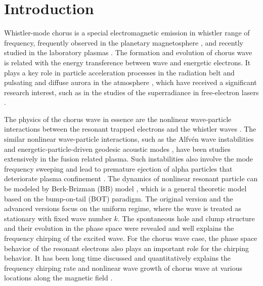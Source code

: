 \section{Introduction}
\label{sec:intro}
Whistler-mode chorus is a special electromagnetic emission in whistler range of frequency, frequently observed in the planetary magnetosphere \cite{helliwell1965whistlers,burtis_magnetospheric_1976,tsurutani_postmidnight_1974}, and recently studied in the laboratory plasmas \cite{vancompernolle2015}.
The formation and evolution of chorus wave is related with the energy transference between wave and energetic electrons.
It plays a key role in particle acceleration processes in the radiation belt \cite{horne_wave_2005,thorne_rapid_2013,reeves_electron_2013} and pulsating and diffuse aurora in the atmosphere \cite{nishimura_identifying_2010,kasahara_pulsating_2018,thorne_scattering_2010}, which have received a significant research interest, such as in the studies of the superradiance in free-electron lasers \cite{zonca_nonlinear_2021, soto-chavez2012}.   

The physics of the chorus wave in essence are the nonlinear wave-particle interactions \cite{oneil1971,oneil1972} between the resonant trapped electrons and the whistler waves \cite{omura_theory_2008, an2019}. 
The similar nonlinear wave-particle interactions, such as the Alfv\'en wave instabilities \cite{chen2016,wang2018,wang2012,wang2012a} and energetic-particle-driven geodesic acoustic modes \cite{wang2013}, have been studies extensively in the fusion related plasma.
Such instabilities also involve the mode frequency sweeping and lead to premature ejection of alpha particles that deteriorate plasma confinement \cite{fasoli2007}.
The dynamics of nonlinear resonant particle can be modeled by Berk-Brizman (BB) model \cite{berk1990,berk1990a,berk1990b,berk1996,berk1997,berk1999}, which is a general theoretic model based on the bump-on-tail (BOT) paradigm. 
The original version and the advanced versions \cite{lilley2009,lilley2014a,vann2007,hezaveh2021,hezaveh2017,breizman2010,hezaveh2020} focus on the uniform regime, where the wave is treated as stationary with fixed wave number $k$. 
The spontaneous hole and clump structure and their evolution in the phase space were revealed and well explains the frequency chirping of the excited wave.
For the chorus wave case, the phase space behavior of the resonant electrons also plays an important role for the  chirping behavior.
It has been long time discussed \cite{sudan_theory_1971,vomvoridis_theory_1982,dysthe_studies_1971,nunn_self-consistent_1974,omura1991} and quantitatively explains the frequency chirping rate and nonlinear wave growth of chorus wave at various locations along the magnetic field \cite{tao_theoretical_2020,omura_nonlinear_2021,zonca_nonlinear_2021,zonca2022}.

